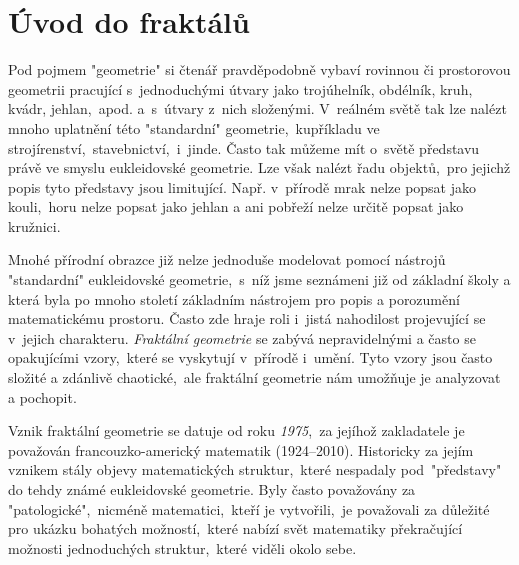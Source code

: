 \chapter{Úvod do fraktálů}\label{chapter:uvod_do_fraktalu}

Pod pojmem "geometrie" si čtenář pravděpodobně vybaví rovinnou či prostorovou geometrii pracující s~jednoduchými útvary jako trojúhelník, obdélník, kruh, kvádr, jehlan,~apod. a~s~útvary z~nich složenými. V~reálném světě tak lze nalézt mnoho uplatnění této "standardní" geometrie,~kupříkladu ve strojírenství,~stavebnictví,~i~jinde. Často tak můžeme mít o~světě představu právě ve smyslu eukleidovské geometrie. Lze však nalézt řadu objektů,~pro jejichž popis tyto představy jsou limitující. Např. v~přírodě mrak nelze popsat jako kouli,~horu nelze popsat jako jehlan a ani pobřeží nelze určitě popsat jako kružnici.\par

Mnohé přírodní obrazce již nelze jednoduše modelovat pomocí nástrojů "standardní" eukleidovské geometrie,~s~níž jsme seznámeni již od základní školy a která byla po mnoho století základním nástrojem pro popis a porozumění matematickému prostoru. Často zde hraje roli i~jistá nahodilost projevující se v~jejich charakteru. \emph{Fraktální geometrie} se zabývá nepravidelnými a často se opakujícími vzory,~které se vyskytují v~přírodě i~umění. Tyto vzory jsou často složité a zdánlivě chaotické,~ale fraktální geometrie nám umožňuje je analyzovat a pochopit.\par

Vznik fraktální geometrie se datuje od roku \emph{1975},~za jejíhož zakladatele je považován francouzko-americký matematik  \mbox{(1924--2010)}. Historicky za jejím vznikem stály objevy matematických struktur,~které nespadaly pod~"představy" do tehdy známé eukleidovské geometrie. Byly často považovány za "patologické",~nicméně matematici,~kteří je vytvořili,~je považovali za důležité pro ukázku bohatých možností,~které nabízí svět matematiky překračující možnosti jednoduchých struktur,~které viděli okolo sebe. \citep[str. 33]{Mandelbrot1983}




